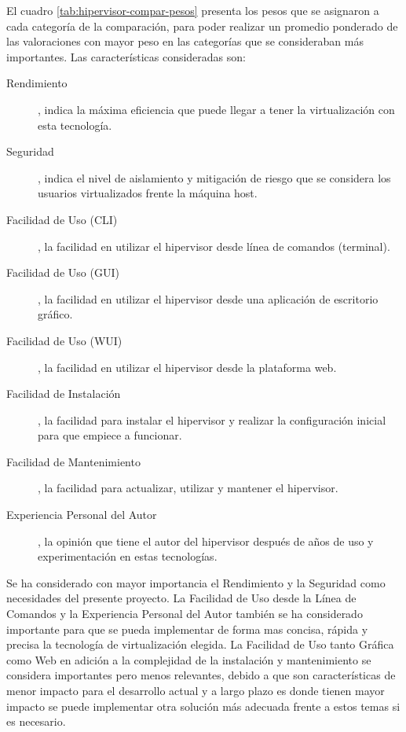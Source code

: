 El cuadro \ref{tab:hipervisor-compar-pesos} presenta los pesos que se asignaron a cada categoría de la comparación, para poder realizar un promedio ponderado de las valoraciones con mayor peso en las categorías que se consideraban más importantes. Las características consideradas son:
\begin{description}
	\item[Rendimiento], indica la máxima eficiencia que puede llegar a tener la virtualización con esta tecnología.
    \item[Seguridad], indica el nivel de aislamiento y mitigación de riesgo que se considera los usuarios virtualizados frente la máquina host.
    \item[Facilidad de Uso (CLI)], la facilidad en utilizar el hipervisor desde línea de comandos (terminal).
    \item[Facilidad de Uso (GUI)], la facilidad en utilizar el hipervisor desde una aplicación de escritorio gráfico.
    \item[Facilidad de Uso (WUI)], la facilidad en utilizar el hipervisor desde la plataforma web.
    \item[Facilidad de Instalación], la facilidad para instalar el hipervisor y realizar la configuración inicial para que empiece a funcionar.
    \item[Facilidad de Mantenimiento], la facilidad para actualizar, utilizar y mantener el hipervisor.
    \item[Experiencia Personal del Autor], la opinión que tiene el autor del hipervisor después de años de uso y experimentación en estas tecnologías.
\end{description}
Se ha considerado con mayor importancia el Rendimiento y la Seguridad como necesidades del presente proyecto. La Facilidad de Uso desde la Línea de Comandos y la Experiencia Personal del Autor también se ha considerado importante para que se pueda implementar de forma mas concisa, rápida y precisa la tecnología de virtualización elegida. La Facilidad de Uso tanto Gráfica como Web en adición a la complejidad de la instalación y mantenimiento se considera importantes pero menos relevantes, debido a que son características de menor impacto para el desarrollo actual y a largo plazo es donde tienen mayor impacto se puede implementar otra solución más adecuada frente a estos temas si es necesario. 

